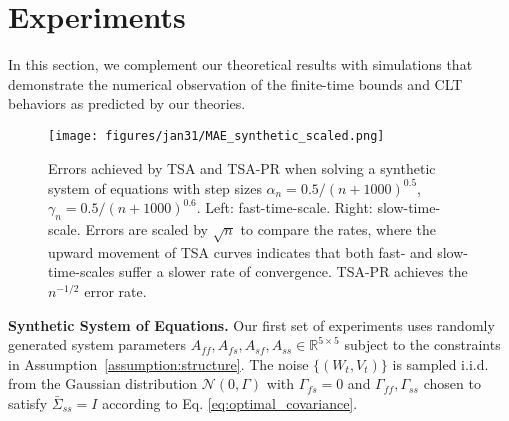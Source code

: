\section{Experiments}
In this section, we complement our theoretical results with simulations that demonstrate the numerical observation of the finite-time bounds and CLT behaviors as predicted by our theories.


\begin{figure}[thbp]
    \centering
    \begin{minipage}[th]{\textwidth}
        \centering
        \texttt{[image: figures/jan31/MAE\_synthetic\_scaled.png]}
    \end{minipage}
    \vspace{-15pt}
    \caption{
    Errors achieved by TSA and TSA-PR when solving a synthetic system of equations with step sizes $\alpha_n=0.5/(n+1000)^{0.5}$, $\gamma_n=0.5/(n+1000)^{0.6}$. 
    Left: fast-time-scale. Right: slow-time-scale.
    Errors are scaled by $\sqrt{n}$ to compare the rates, where the upward movement of TSA curves indicates that both fast- and slow-time-scales suffer a slower rate of convergence. 
    TSA-PR achieves the $n^{-1/2}$ error rate. 
    }
    \label{fig:synthetic}
\end{figure}

\noindent\textbf{Synthetic System of Equations.} 
Our first set of experiments uses randomly generated system parameters $A_{ff},A_{fs},A_{sf},A_{ss}\in\mathbb{R}^{5\times 5}$ subject to the constraints in Assumption~\ref{assumption:structure}. 
The noise $\{(W_t, V_t)\}$ is sampled i.i.d. from the Gaussian distribution $\mathcal{N}(0, \Gamma)$ with $\Gamma_{fs} = 0$ and $\Gamma_{ff}, \Gamma_{ss}$ chosen to satisfy $\bar{\Sigma}_{ss} = I$ according to Eq. \eqref{eq:optimal_covariance}.


